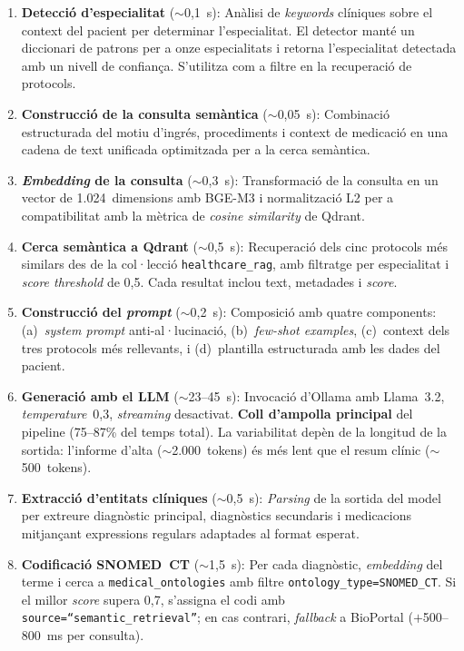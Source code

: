 \documentclass[CAT]{TFUOC}%
\begin{document}
\begin{enumerate}
    \item \textbf{Detecció d'especialitat} ($\sim$0,1~s): Anàlisi de \textit{keywords} clíniques sobre el context del pacient per determinar l'especialitat. El detector manté un diccionari de patrons per a onze especialitats i retorna l'especialitat detectada amb un nivell de confiança. S'utilitza com a filtre en la recuperació de protocols.

    \item \textbf{Construcció de la consulta semàntica} ($\sim$0,05~s): Combinació estructurada del motiu d'ingrés, procediments i context de medicació en una cadena de text unificada optimitzada per a la cerca semàntica.

    \item \textbf{\textit{Embedding} de la consulta} ($\sim$0,3~s): Transformació de la consulta en un vector de 1.024~dimensions amb BGE-M3 i normalització L2 per a compatibilitat amb la mètrica de \textit{cosine similarity} de Qdrant.

    \item \textbf{Cerca semàntica a Qdrant} ($\sim$0,5~s): Recuperació dels cinc protocols més similars des de la col·lecció \texttt{healthcare\_rag}, amb filtratge per especialitat i \textit{score threshold} de 0,5. Cada resultat inclou text, metadades i \textit{score}.

    \item \textbf{Construcció del \textit{prompt}} ($\sim$0,2~s): Composició amb quatre components: (a)~\textit{system prompt} anti-al·lucinació, (b)~\textit{few-shot examples}, (c)~context dels tres protocols més rellevants, i (d)~plantilla estructurada amb les dades del pacient.

    \item \textbf{Generació amb el LLM} ($\sim$23--45~s): Invocació d'Ollama amb Llama~3.2, \textit{temperature}~0,3, \textit{streaming} desactivat. \textbf{Coll d'ampolla principal} del pipeline (75--87\% del temps total). La variabilitat depèn de la longitud de la sortida: l'informe d'alta ($\sim$2.000~tokens) és més lent que el resum clínic ($\sim$500~tokens).

    \item \textbf{Extracció d'entitats clíniques} ($\sim$0,5~s): \textit{Parsing} de la sortida del model per extreure diagnòstic principal, diagnòstics secundaris i medicacions mitjançant expressions regulars adaptades al format esperat.

    \item \textbf{Codificació SNOMED~CT} ($\sim$1,5~s): Per cada diagnòstic, \textit{embedding} del terme i cerca a \texttt{medical\_ontologies} amb filtre \texttt{ontology\_type=SNOMED\_CT}. Si el millor \textit{score} supera 0,7, s'assigna el codi amb \texttt{source=``semantic\_retrieval''}; en cas contrari, \textit{fallback} a BioPortal ($+$500--800~ms per consulta).


\end{enumerate}
\end{document}
